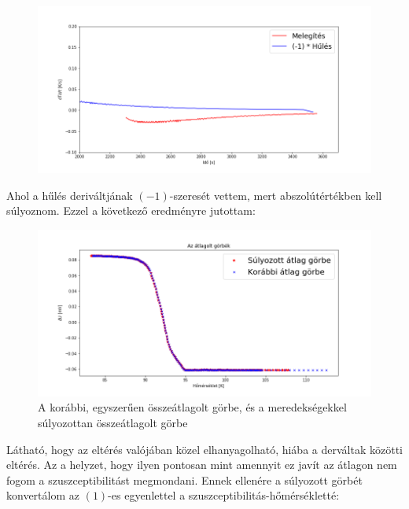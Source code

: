 \documentclass[a4paper,12pt]{article}
\begin{document}
\vspace{2mm}

\begin{figure}[!htb]
\centering
\includegraphics[width=.95\textwidth]{derivTempCoolingHeating.png}
\end{figure}

\vspace{2mm}

\par Ahol a hűlés deriváltjának $(-1)$-szeresét vettem, mert abszolútértékben kell súlyoznom. Ezzel a következő eredményre 
jutottam:

\vspace{2mm}

\begin{figure}[!htb]
\centering
\includegraphics[width=.95\textwidth]{weightedMeanPlot.png}
\caption{A korábbi, egyszerűen összeátlagolt görbe, és a meredekségekkel súlyozottan összeátlagolt görbe}
\end{figure}

\vspace{2mm}

\par Látható, hogy az eltérés valójában közel elhanyagolható, hiába a derváltak közötti eltérés. Az a helyzet, hogy ilyen pontosan mint amennyit ez javít az átlagon nem fogom a szuszceptibilitást megmondani. Ennek ellenére a súlyozott görbét konvertálom az $(1)$-es egyenlettel a szuszceptibilitás-hőmérsékletté:
\end{document}
